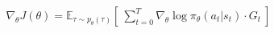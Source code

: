 \begin{align}
\nabla_\theta J(\theta) = \mathbb{E}_{\tau \sim p_{\theta}(\tau)} \left\lbrack\ \sum_{t=0}^{T} \nabla_\theta \log \pi_\theta(a_t | s_t) \cdot G_t \ \right\rbrack
\end{align}